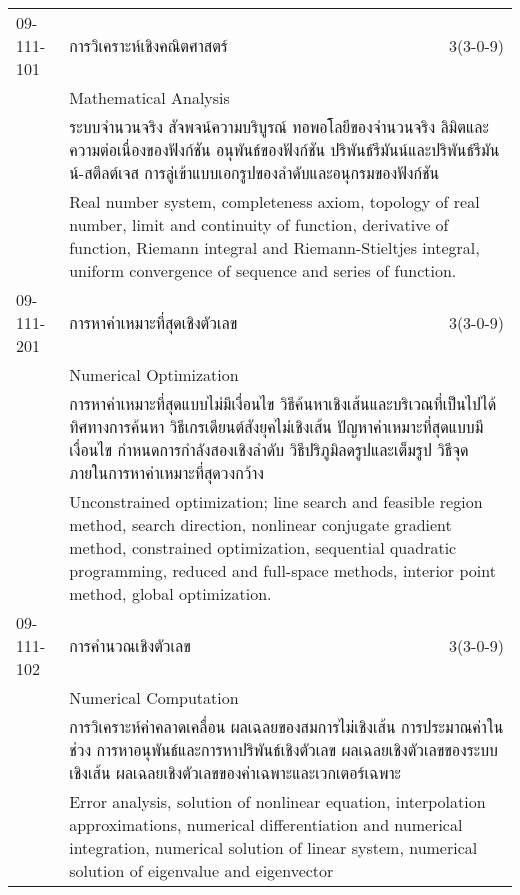 \begin{longtable}{p{}p{}r{}}
09-111-101 & การวิเคราะห์เชิงคณิตศาสตร์ & 3(3-0-9)\\*
 & Mathematical Analysis & \phantom{x} \vspace{3mm} \\*
&  \multicolumn{2}{p{0.75\textwidth}}{ระบบจำนวนจริง สัจพจน์ความบริบูรณ์ ทอพอโลยีของจำนวนจริง ลิมิตและความต่อเนื่องของฟังก์ชัน อนุพันธ์ของฟังก์ชัน ปริพันธ์รีมันน์และปริพันธ์รีมันน์-สตีลต์เจส การลู่เข้าแบบเอกรูปของลำดับและอนุกรมของฟังก์ชัน} \vspace{3mm} \\*
&  \multicolumn{2}{p{0.75\textwidth}}{Real number system, completeness axiom, topology of real number, limit and continuity of function, derivative of function, Riemann integral and Riemann-Stieltjes integral, uniform convergence of sequence and series of function.} \vspace{8mm} \\*
09-111-201 & การหาค่าเหมาะที่สุดเชิงตัวเลข & 3(3-0-9)\\*
 & Numerical Optimization & \phantom{x} \vspace{3mm} \\*
&  \multicolumn{2}{p{0.75\textwidth}}{การหาค่าเหมาะที่สุดแบบไม่มีเงื่อนไข วิธีค้นหาเชิงเส้นและบริเวณที่เป็นไปได้ ทิศทางการค้นหา วิธีเกรเดียนต์สังยุคไม่เชิงเส้น ปัญหาค่าเหมาะที่สุดแบบมีเงื่อนไข กำหนดการกำลังสองเชิงลำดับ วิธีปริภูมิลดรูปและเต็มรูป วิธีจุดภายในการหาค่าเหมาะที่สุดวงกว้าง} \vspace{3mm} \\*
&  \multicolumn{2}{p{0.75\textwidth}}{Unconstrained optimization; line search and feasible region method, search direction, nonlinear conjugate gradient method, constrained optimization, sequential quadratic programming, reduced and full-space methods, interior point method, global optimization.} \vspace{8mm} \\*
09-111-102 & การคำนวณเชิงตัวเลข & 3(3-0-9)\\*
 & Numerical Computation & \phantom{x} \vspace{3mm} \\*
&  \multicolumn{2}{p{0.75\textwidth}}{การวิเคราะห์ค่าคลาดเคลื่อน ผลเฉลยของสมการไม่เชิงเส้น การประมาณค่าในช่วง การหาอนุพันธ์และการหาปริพันธ์เชิงตัวเลข ผลเฉลยเชิงตัวเลขของระบบเชิงเส้น ผลเฉลยเชิงตัวเลขของค่าเฉพาะและเวกเตอร์เฉพาะ} \vspace{3mm} \\*
&  \multicolumn{2}{p{0.75\textwidth}}{Error analysis, solution of nonlinear equation, interpolation approximations, numerical differentiation and numerical integration, numerical solution of linear system, numerical solution of eigenvalue and eigenvector} \vspace{8mm} \\*

\end{longtable}
